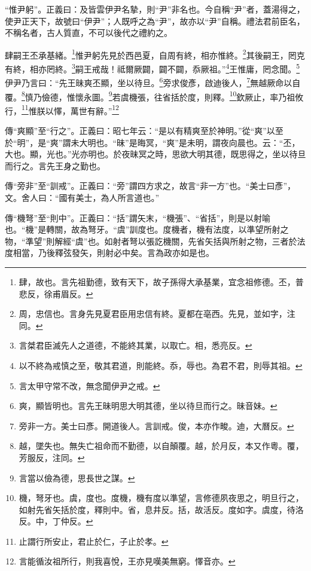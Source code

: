 {\noindent\shu{}\fzkt “惟尹躬”。正義曰：及皆雲伊尹名摯，則“尹”非名也。今自稱“尹”者，蓋湯得之，使尹正天下，故號曰“伊尹”；人既呼之為“尹”，故亦以“尹”自稱。禮法君前臣名，不稱名者，古人質直，不可以後代之禮約之。 \par}

肆嗣王丕承基緒。\footnote{肆，故也。言先祖勤德，致有天下，故子孫得大承基業，宜念祖修德。丕，普悲反，徐甫眉反。}惟尹躬先見於西邑夏，自周有終，相亦惟終。\footnote{周，忠信也。言身先見夏君臣用忠信有終。夏都在亳西。先見，並如字，注同。}其後嗣王，罔克有終，相亦罔終。\footnote{言桀君臣滅先人之道德，不能終其業，以取亡。相，悉亮反。}嗣王戒哉！祗爾厥闢，闢不闢，忝厥祖。”\footnote{以不終為戒慎之至，敬其君道，則能終。忝，辱也。為君不君，則辱其祖。}王惟庸，罔念聞。\footnote{言太甲守常不改，無念聞伊尹之戒。}伊尹乃言曰：“先王昧爽丕顯，坐以待旦。\footnote{爽，顯皆明也。言先王昧明思大明其德，坐以待旦而行之。昧音妹。}旁求俊彥，啟迪後人，\footnote{旁非一方。美士曰彥。開道後人。言訓戒。俊，本亦作畯。迪，大曆反。}無越厥命以自覆。\footnote{越，墜失也。無失亡祖命而不勤德，以自顛覆。越，於月反，本又作粵。覆，芳服反，注同。}慎乃儉德，惟懷永圖。\footnote{言當以儉為德，思長世之謀。}若虞機張，往省括於度，則釋。\footnote{機，弩牙也。虞，度也。度機，機有度以準望，言修德夙夜思之，明旦行之，如射先省矢括於度，釋則中。省，息井反。括，故活反。度如字。虞度，待洛反。中，丁仲反。}欽厥止，率乃祖攸行，\footnote{止謂行所安止，君止於仁，子止於孝。}惟朕以懌，萬世有辭。”\footnote{言能循汝祖所行，則我喜悅，王亦見嘆美無窮。懌音亦。}

{\noindent\zhuan{}\fzbyks 傳“爽顯”至“行之”。正義曰：昭七年云：“是以有精爽至於神明。”從“爽”以至於“明”，是“爽”謂未大明也。“昧”是晦冥，“爽”是未明，謂夜向晨也。云：“丕，大也。顯，光也。”光亦明也。於夜昧冥之時，思欲大明其德，既思得之，坐以待旦而行之。言先王身之勤也。 \par}

{\noindent\zhuan{}\fzbyks 傳“旁非”至“訓戒”。正義曰：“旁”謂四方求之，故言“非一方”也。“美士曰彥”，文。舍人曰：“國有美士，為人所言道也。” \par}

{\noindent\zhuan{}\fzbyks 傳“機弩”至“則中”。正義曰：“括”謂矢末，“機張”、“省括”，則是以射喻也。“機”是轉關，故為弩牙。“虞”訓度也。度機者，機有法度，以準望所射之物，“準望”則解經“虞”也。如射者弩以張訖機關，先省矢括與所射之物，三者於法度相當，乃後釋弦發矢，則射必中矣。言為政亦如是也。 \par}

